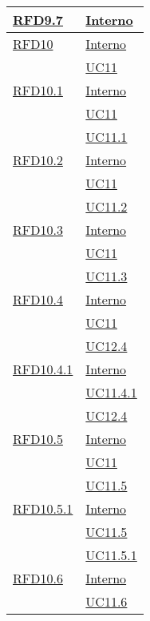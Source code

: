 \begin{longtable}{|>{\centering}m{5cm}|m{5cm}<{\centering}|}
\hyperlink{RFD9.7}{RFD9.7} & \hyperlink{Interno}{Interno}\\ \hline

\hyperlink{RFD10}{RFD10} & \hyperlink{Interno}{Interno}\\
& \hyperref[UC11]{UC11}\\ \hline

\hyperlink{RFD10.1}{RFD10.1} & \hyperlink{Interno}{Interno}\\
& \hyperref[UC11]{UC11}\\
& \hyperref[UC11.1]{UC11.1}\\ \hline

\hyperlink{RFD10.2}{RFD10.2} & \hyperlink{Interno}{Interno}\\
& \hyperref[UC11]{UC11}\\
& \hyperref[UC11.2]{UC11.2}\\ \hline

\hyperlink{RFD10.3}{RFD10.3} & \hyperlink{Interno}{Interno}\\
& \hyperref[UC11]{UC11}\\
& \hyperref[UC11.3]{UC11.3}\\ \hline

\hyperlink{RFD10.4}{RFD10.4} & \hyperlink{Interno}{Interno}\\
& \hyperref[UC11]{UC11}\\
& \hyperref[UC12.4]{UC12.4}\\ \hline

\hyperlink{RFD10.4.1}{RFD10.4.1} & \hyperlink{Interno}{Interno}\\
& \hyperref[UC11.4.1]{UC11.4.1}\\
& \hyperref[UC12.4]{UC12.4}\\ \hline

\hyperlink{RFD10.5}{RFD10.5} & \hyperlink{Interno}{Interno}\\
& \hyperref[UC11]{UC11}\\
& \hyperref[UC11.5]{UC11.5}\\ \hline

\hyperlink{RFD10.5.1}{RFD10.5.1} & \hyperlink{Interno}{Interno}\\
& \hyperref[UC11.5]{UC11.5}\\
& \hyperref[UC11.5.1]{UC11.5.1}\\ \hline

\hyperlink{RFD10.6}{RFD10.6} & \hyperlink{Interno}{Interno}\\
& \hyperref[UC11.6]{UC11.6}\\ \hline


\end{longtable}
